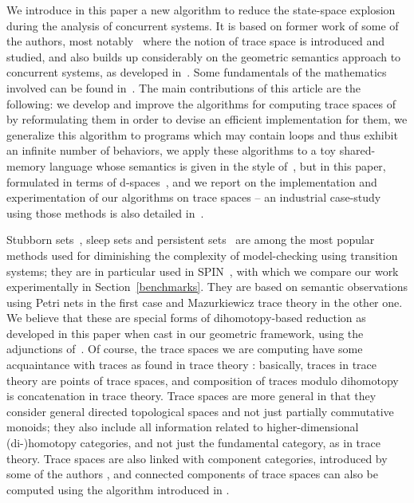 \documentclass[orivec]{llncs} \usepackage[T1]{fontenc}
\begin{document}
We introduce in this paper a new algorithm to reduce the state-space explosion
during the analysis of concurrent systems. It is based on former work of some of
the authors, most notably~\cite{raussen2010simplicial} where the notion of trace
space is introduced and studied, and also builds up considerably on the
geometric semantics approach to concurrent systems, as developed
in~\cite{tcs}. Some fundamentals of the mathematics involved can be found
in~\cite{grandis}. The main contributions of this article are the following: we
develop and improve the algorithms for computing trace spaces
of~\cite{raussen2010simplicial} by reformulating them in order to devise an
efficient implementation for them, we generalize this algorithm to programs
which may contain loops and thus exhibit an infinite number of behaviors, we
apply these algorithms to a toy shared-memory language whose semantics is given
in the style of~\cite{fajstrup2000infinitely}, but in this paper, formulated in
terms of d-spaces~\cite{grandis},
and we report on the implementation and experimentation of our algorithms on
trace spaces -- an industrial case-study using those methods is also detailed
in~\cite{rigorous-evidence}.


Stubborn sets~\cite{AVStubborn2}, sleep sets and persistent
sets~\cite{PGPWUsing} are among the most popular methods used for diminishing
the complexity of model-checking using transition systems; they are in
particular used in SPIN~\cite{spin}, with which we compare our work
experimentally in Section~\ref{benchmarks}. They are based on semantic
observations using Petri nets in the first case and Mazurkiewicz trace theory in
the other one. We believe that these are special forms of dihomotopy-based
reduction as developed in this paper when cast in our geometric framework, using
the adjunctions of~\cite{getco2010}. Of course, the trace spaces we are
computing have some acquaintance with traces as found in trace theory
\cite{tracetheory}: basically, traces in trace theory are points of trace
spaces, and composition of traces modulo dihomotopy is concatenation in trace
theory. Trace spaces are more general in that they consider general directed
topological spaces and not just partially commutative monoids; they also include
all information related to higher-dimensional (di-)homotopy categories, and not
just the fundamental category, as in trace theory. Trace spaces are also linked
with component categories, introduced by some of the authors \cite{apcs,apcs2},
and connected components of trace spaces can also be computed using the
algorithm introduced in \cite{concur05}.
\end{document}
